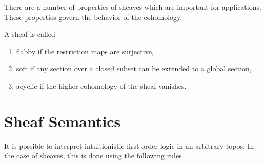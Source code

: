 %
%

There are a number of properties of sheaves which are important for applications. These properties govern the behavior of the cohomology.

\begin{definition}
  A sheaf is called
  \begin{enumerate}
    \item flabby if the restriction maps are surjective,
    \item soft if any section over a closed subset can be extended to a global section,
    \item acyclic if the higher cohomology of the sheaf vanishes. 
  \end{enumerate} 
\end{definition}

\section{Sheaf Semantics}
It is possible to interpret intuitionistic first-order logic in an arbitrary topos. In the case of sheaves, this is done using the following rules